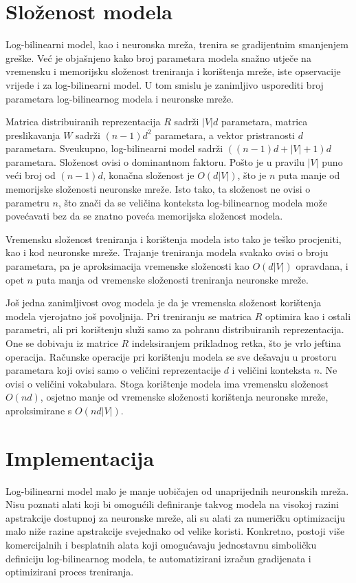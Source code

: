 \documentclass[times, utf8, diplomski, numeric]{fer}
\begin{document}
\section{Složenost modela}

Log-bilinearni model, kao i neuronska mreža, trenira se gradijentnim smanjenjem greške. Već je objašnjeno kako broj parametara modela snažno utječe na vremensku i memorijsku složenost treniranja i korištenja mreže, iste opservacije vrijede i za log-bilinearni model. U tom smislu je zanimljivo usporediti broj parametara log-bilinearnog modela i neuronske mreže.

Matrica distribuiranih reprezentacija $R$ sadrži $|V| d$ parametara, matrica preslikavanja $W$ sadrži $(n - 1) d^2$ parametara, a vektor pristranosti $d$ parametara. Sveukupno, log-bilinearni model sadrži $\left((n - 1) d + |V| + 1\right) d$ parametara. Složenost ovisi o dominantnom faktoru. Pošto je u pravilu $|V|$ puno veći broj od $(n - 1) d$, konačna složenost je $O(d |V|)$, što je $n$ puta manje od memorijske složenosti neuronske mreže. Isto tako, ta složenost ne ovisi o parametru $n$, što znači da se veličina konteksta log-bilinearnog modela može povećavati bez da se znatno poveća memorijska složenost modela.

Vremensku složenost treniranja i korištenja modela isto tako je teško procjeniti, kao i kod neuronske mreže. Trajanje treniranja modela svakako ovisi o broju parametara, pa je aproksimacija vremenske složenosti kao $O(d |V|)$ opravdana, i opet $n$ puta manja od vremenske složenosti treniranja neuronske mreže.

Još jedna zanimljivost ovog modela je da je vremenska složenost korištenja modela vjerojatno još povoljnija. Pri treniranju se matrica $R$ optimira kao i ostali parametri, ali pri korištenju služi samo za pohranu distribuiranih reprezentacija. One se dobivaju iz matrice $R$ indeksiranjem prikladnog retka, što je vrlo jeftina operacija. Računske operacije pri korištenju modela se sve dešavaju u prostoru parametara koji ovisi samo o veličini reprezentacije $d$ i veličini konteksta $n$. Ne ovisi o veličini vokabulara. Stoga korištenje modela ima vremensku složenost $O(n d)$, osjetno manje od vremenske složenosti korištenja neuronske mreže, aproksimirane s $O(n d |V|)$.

\section{Implementacija}

Log-bilinearni model malo je manje uobičajen od unaprijednih neuronskih mreža. Nisu poznati alati koji bi omogućili definiranje takvog modela na visokoj razini apstrakcije dostupnoj za neuronske mreže, ali su alati za numeričku optimizaciju malo niže razine apstrakcije svejednako od velike koristi. Konkretno, postoji više komercijalnih i besplatnih alata koji omogućavaju jednostavnu simboličku definiciju log-bilinearnog modela, te automatizirani izračun gradijenata i optimizirani proces treniranja.
\end{document}
